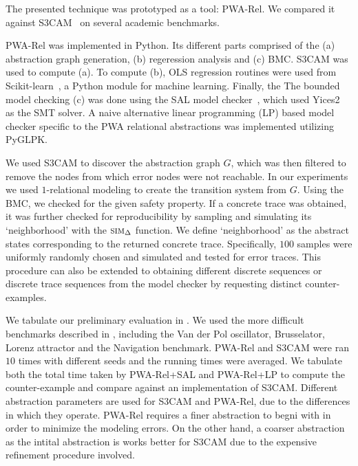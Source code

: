 The presented technique was prototyped as a tool: PWA-Rel.
We compared it against S3CAM~\cite{zutshi2014multiple} on several academic
benchmarks.

PWA-Rel was implemented in Python. Its different parts comprised of
the (a) abstraction graph generation, (b) regeression analysis and (c)
BMC. S3CAM was used to compute (a). To compute (b), OLS regression
routines were used from Scikit-learn~\cite{pedregosa2011scikit}, a
Python module for machine learning. Finally, the The bounded model
checking (c) was done using the SAL model checker~\cite{SAL-SRI},
which used Yices2~\cite{dutertre2014yices} as the SMT solver. A naive
alternative linear programming (LP) based model checker specific to the PWA
relational abstractions was implemented utilizing PyGLPK.

We used S3CAM to discover the abstraction graph $G$, which was then
filtered to remove the nodes from which error nodes were not
reachable. In our experiments we used $1$-relational modeling to
create the transition system from $G$. Using the BMC, we checked for
the given safety property. If a concrete trace was obtained, it was
further checked for reproducibility by sampling and simulating its `neighborhood' with the
$\mbox{\sc sim}_\Delta$ function. We define `neighborhood' as the abstract states
corresponding to the returned concrete trace. Specifically, $100$
samples were uniformly randomly chosen and simulated and tested for
error traces. This procedure can also be extended to obtaining
different discrete sequences or discrete trace sequences from the
model checker by requesting distinct counter-examples.


We tabulate our preliminary evaluation in . We used
the more difficult benchmarks described in \cite{zutshi2014multiple},
including the Van der Pol oscillator, Brusselator, Lorenz attractor
and the Navigation benchmark. PWA-Rel and S3CAM were ran $10$ times
with different seeds and the running times were averaged. We tabulate
both the total time taken by PWA-Rel+SAL and PWA-Rel+LP to compute the
counter-example and compare against an implementation of S3CAM.
Different abstraction parameters are used for S3CAM and PWA-Rel, due
to the differences in which they operate. PWA-Rel requires a finer
abstraction to begni with in order to minimize the modeling errors.
On the other hand, a coarser abstraction as the intital abstraction is
works better for S3CAM due to the expensive refinement procedure
involved.

